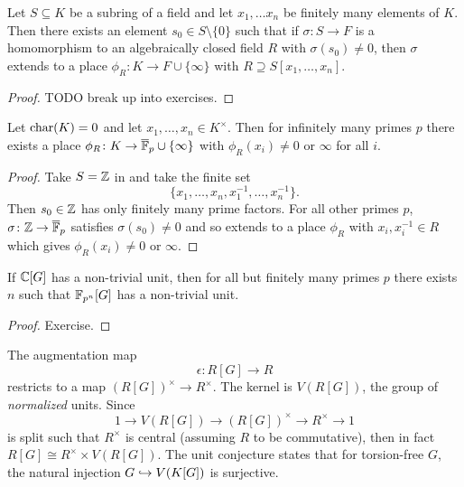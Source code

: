 \begin{lemma}
    \label{lemma:test_element_for_place}
    Let $S \subseteq K$ be a subring of a field and let $x_1, \dots x_n$ be finitely many elements of $K$.
    Then there exists an element $s_0 \in S \setminus \{0\}$ such that if $\sigma \colon S \to F$ is a homomorphism to an algebraically closed field $R$ with $\sigma(s_0) \neq 0$, then $\sigma$ extends to a place $\phi_R \colon K \to F \cup \{\infty\}$ with $R \supseteq S[x_1, \dots, x_n]$.
\end{lemma}

\begin{proof}
    TODO break up into exercises.
\end{proof}

\begin{corollary}
    \label{corollary:place_finite_almost_all_primes}
    Let $\mathrm{char}(K) = 0$ and let $x_1, \dots, x_n \in K^\times$.
    Then for infinitely many primes $p$ there exists a place $\phi_R \colon K \to \overline{\mathbb{F}}_p \cup \{\infty\}$ with $\phi_R(x_i) \neq 0$ or $\infty$ for all $i$.
\end{corollary}

\begin{proof}
    Take $S = \mathbb{Z}$ in  and take the finite set \[
        \{x_1, \dots, x_n, x_1^{-1}, \dots, x_n^{-1}\}.
    \]
    Then $s_0 \in \mathbb{Z}$ has only finitely many prime factors.
    For all other primes $p$, $\sigma \colon \mathbb{Z} \to \overline{\mathbb{F}}_p$ satisfies $\sigma(s_0) \neq 0$ and so extends to a place $\phi_R$ with $x_i, x_i^{-1} \in R$ which gives $\phi_R(x_i) \neq 0$ or $\infty$.
\end{proof}

\begin{corollary}
    If $\mathbb{C}[G]$ has a non-trivial unit, then for all but finitely many primes $p$ there exists $n$ such that $\mathbb{F}_{p^n}[G]$ has a non-trivial unit.
\end{corollary}

\begin{proof}
    Exercise.
\end{proof}

The augmentation map \[
    \epsilon \colon R[G] \to R
\] restricts to a map $(R[G])^\times \to R^\times$.
The kernel is $V(R[G])$, the group of \emph{normalized} units.
Since \[
    1 \to V(R[G]) \to (R[G])^\times \to R^\times \to 1
\] is split such that $R^\times$ is central (assuming $R$ to be commutative), then in fact $R[G] \cong R^\times \times V(R[G])$.
The unit conjecture states that for torsion-free $G$, the natural injection $G \hookrightarrow V(K[G])$ is surjective.

